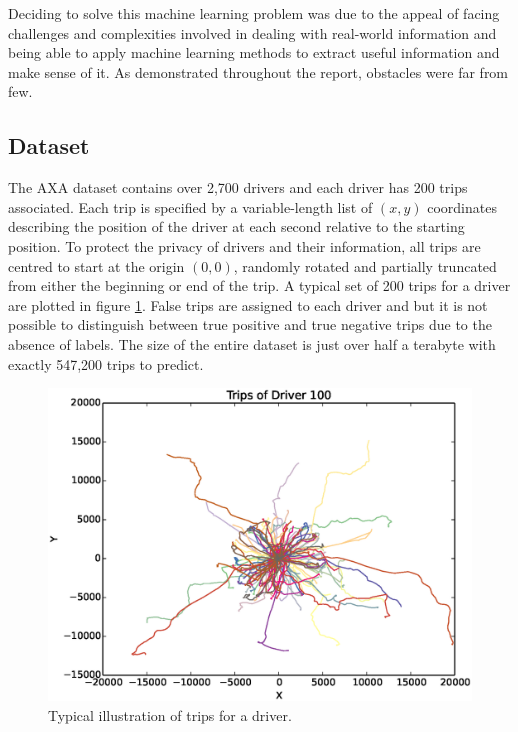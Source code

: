 \documentclass[a4paper, 11pt, twocolumn]{report}
\begin{document}
Deciding to solve this machine learning problem was due to the appeal of facing challenges and complexities involved in dealing with real-world information and being able to apply machine learning methods to extract useful information and make sense of it.
As demonstrated throughout the report, obstacles were far from few.

\subsection{Dataset}

The AXA dataset contains over 2,700 drivers and each driver has 200 trips associated.
Each trip is specified by a variable-length list of $(x,y)$ coordinates describing the position of the driver at each second relative to the starting position.
To protect the privacy of drivers and their information, all trips are centred to start at the origin $(0,0)$, randomly rotated and partially truncated from either the beginning or end of the trip.
A typical set of 200 trips for a driver are plotted in figure \ref{fig:tripsgraph}.
False trips are assigned to each driver and but it is not possible to distinguish between true positive and true negative trips due to the absence of labels.
The size of the entire dataset is just over half a terabyte with exactly 547,200 trips to predict.

\begin{figure}[h]
    \center
    \includegraphics[width=\linewidth]{img/sample_driver_vis.eps}
    \caption{Typical illustration of trips for a driver.}
    \label{fig:tripsgraph}
\end{figure}
\end{document}
